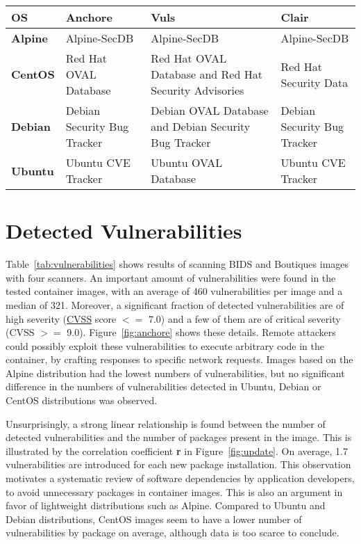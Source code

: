 \begin{center}
\tabulinesep=1.2mm
\begin{tabu} to \textwidth { | X[l] | X[l] | X[l] | X[l] | }
 \hline
\textbf{OS} &   \textbf{Anchore} &      \textbf{Vuls} & \textbf{Clair} \\
\hline
        \textbf{Alpine} & Alpine-SecDB &        Alpine-SecDB &  Alpine-SecDB \\
\hline
        \textbf{CentOS} & Red Hat OVAL Database & Red Hat OVAL Database and Red Hat Security Advisories & Red Hat Security Data \\
\hline
        \textbf{Debian} & Debian Security Bug Tracker & Debian OVAL Database and Debian Security Bug Tracker & Debian Security Bug Tracker \\
\hline
        \textbf{Ubuntu} & Ubuntu CVE Tracker &  Ubuntu OVAL Database &  Ubuntu CVE Tracker \\
 \hline
\end{tabu}
\label{tab:databases}
\end{center}
\addtocounter{table}{-1}
\section{Detected Vulnerabilities}

Table~\ref{tab:vulnerabilities} shows results of scanning BIDS and Boutiques 
images with four scanners. 
An important amount of vulnerabilities were found in the tested container
images, with an average of 460 vulnerabilities
per image and a median of 321.
Moreover, a significant fraction of detected vulnerabilities are
of high severity
(\href{https://www.first.org/cvss/specification-document}{CVSS} score
\(<=\)
7.0) and a few of them are of critical severity (CVSS \(>=\) 9.0).
Figure~\ref{fig:anchore} shows these details. Remote
attackers could possibly exploit these vulnerabilities to execute
arbitrary code in the container, by crafting responses to specific network
requests. Images based on the Alpine distribution
had the lowest numbers of vulnerabilities, but no significant difference
in the numbers of vulnerabilities detected in
Ubuntu, Debian or CentOS distributions was observed.

Unsurprisingly, a strong linear relationship is found between the number of
detected vulnerabilities and the number of packages present in the
image. This is illustrated by the correlation coefficient \textbf{r} in Figure~\ref{fig:update}. On average, 1.7 vulnerabilities are introduced for
each new package installation. This observation motivates a systematic
review of software dependencies by application developers, to avoid
unnecessary packages in container images. This is also an argument in favor of lightweight
distributions such as Alpine. Compared to Ubuntu and Debian distributions,
CentOS images seem to have a lower number of vulnerabilities by package on
average, although data is too scarce to conclude.


